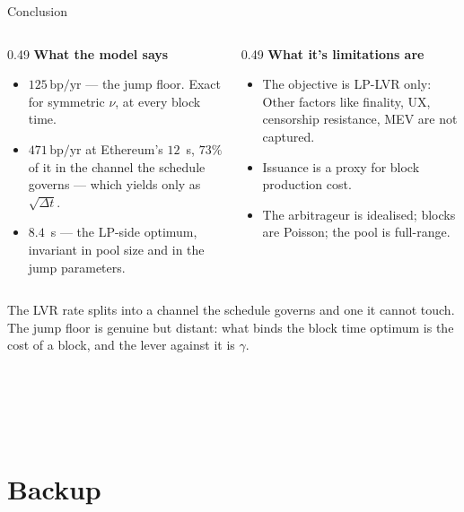 \documentclass[10pt,xcolor=x11names,aspectratio=169]{beamer}
\makeatletter
\newcommand{\dt}{\Delta t}
\newcommand{\1}{\mathbf{1}}
\newcommand{\bpyr}{\,\text{bp/yr}}
\renewcommand{\closingslide}{%
  {\zhaw@nightcanvas
   \begin{frame}
     \usebeamerfont{orginfo}%
     \zhawuniversity\par\vskip 2.5mm
     \textbf{\zhawinstitute}\par\vskip 2.5mm
     \zhawpresenter\\\zhawposition\\\zhawaddress\\
     \zhawemail\\\zhawweb\par
     \vfill
   \end{frame}}}
\makeatother
\begin{document}
\begin{frame}{Conclusion}
  \begin{columns}[T]
    \begin{column}{0.49\textwidth}
      \textbf{What the model says}
      \begin{itemize}
        \item $125\bpyr$ --- the jump floor. Exact for symmetric $\nu$, at
              every block time.
        \item $471\bpyr$ at Ethereum's $12$~s, $73\%$ of it in the channel
              the schedule governs --- which yields only as $\sqrt{\dt}$.
        \item $8.4$~s --- the LP-side optimum, invariant in pool size and
              in the jump parameters.
      \end{itemize}
    \end{column}
    \begin{column}{0.49\textwidth}
      \textbf{What it's limitations are}
      \begin{itemize}
        \item The objective is LP-LVR only: Other factors like finality, UX, censorship resistance, MEV are not captured.
        \item Issuance is a proxy for block production cost.
        \item The arbitrageur is idealised; blocks are Poisson; the pool is full-range.
      \end{itemize}
    \end{column}
  \end{columns}
  \begin{takeaway}
    The LVR rate splits into a channel the schedule governs and one it cannot touch.
    The jump floor is genuine but distant: what binds the block time optimum is the cost 
    of a block, and the lever against it is $\gamma$.
  \end{takeaway}
\end{frame}

\questionsslide

\closingslide

\appendix

\section{Backup}
\end{document}
